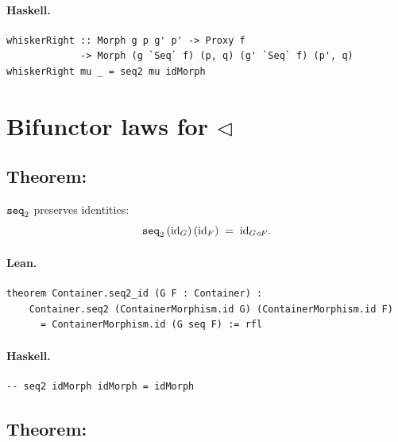 \documentclass[11pt,a4paper]{article}
\begin{document}
\paragraph{Haskell.}
\begin{lstlisting}[style=haskell]
whiskerRight :: Morph g p g' p' -> Proxy f
             -> Morph (g `Seq` f) (p, q) (g' `Seq` f) (p', q)
whiskerRight mu _ = seq2 mu idMorph
\end{lstlisting}


\section{Bifunctor laws for \texorpdfstring{$\triangleleft$}{seq}}

\subsection{Theorem: }

\begin{thm}
$\texttt{seq}_2$ preserves identities:
\[
  \texttt{seq}_2\,(\mathrm{id}_G)\,(\mathrm{id}_F) \;=\; \mathrm{id}_{G \triangleleft F}.
\]
\end{thm}

\paragraph{Lean.}
\begin{lstlisting}[style=lean]
theorem Container.seq2_id (G F : Container) :
    Container.seq2 (ContainerMorphism.id G) (ContainerMorphism.id F)
      = ContainerMorphism.id (G seq F) := rfl
\end{lstlisting}

\paragraph{Haskell.}
\begin{lstlisting}[style=haskell]
-- seq2 idMorph idMorph = idMorph
\end{lstlisting}


\subsection{Theorem: }
\end{document}
